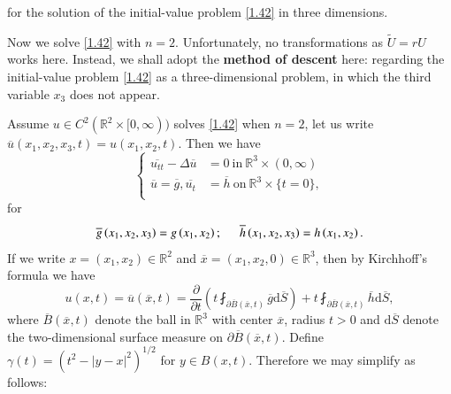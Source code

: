for the solution of the initial-value problem \eqref{1.42} in three dimensions.\par
Now we solve \eqref{1.42} with $n=2$. Unfortunately, no transformations as $\widetilde{U}=rU$ works here. Instead, we shall adopt the \textbf{method of descent} here: regarding the initial-value problem \eqref{1.42} as a three-dimensional problem, in which the third variable $x_3$ does not appear.\par
Assume $u\in C^2(\mathbb{R}^2\times[0,\infty))$ solves \eqref{1.42} when $n=2$, let us write $\overline{u}(x_1,x_2,x_3,t)=u(x_1,x_2,t)$. Then we have 
$$
\left\{ \begin{aligned}
	\overline{u_{tt}}-\Delta \overline{u}&=0\ \text{in}\ \mathbb{R}^3\times(0,\infty)\\
	\overline{u}=\overline{g},\overline{u_t}&=\overline{h}\ \text{on}\ \mathbb{R}^3\times\{t=0\},\\
\end{aligned} \right. 
$$
for 
$$
\overline{g}\left( x_1,x_2,x_3 \right) =g\left( x_1,x_2 \right) ;\hspace{0.5cm}\overline{h}\left( x_1,x_2,x_3 \right) =h\left( x_1,x_2 \right) .
$$
If we write $x=(x_1,x_2)\in\mathbb{R}^2$ and $\overline{x}=(x_1,x_2,0)\in\mathbb{R}^3$, then by Kirchhoff's formula we have 
$$
u\left( x,t \right) =\overline{u}\left( \overline{x},t \right) =\frac{\partial}{\partial t}\left( t\fint_{\partial \overline{B}\left( \overline{x},t \right)}{\overline{g}\mathrm{d}\overline{S}} \right) +t\fint_{\partial \overline{B}\left( \overline{x},t \right)}{\overline{h}\mathrm{d}\overline{S}},
$$
where $\overline{B}(\overline{x},t)$ denote the ball in $\mathbb{R}^3$ with center $\overline{x}$, radius $t>0$ and $\mathrm{d}\overline{S}$ denote the two-dimensional surface measure on $\partial\overline{B}(\overline{x},t)$. Define $\gamma(t)=(t^2-|y-x|^2)^{1/2}$ for $y\in B(x,t)$. Therefore we may simplify as follows: 
